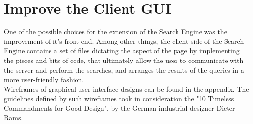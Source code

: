 \section{Improve the Client GUI} %
One of the possible choices for the extension of the Search Engine was the improvement of it's front end. Among other things, the client side of the Search Engine contains a set of files dictating the aspect of the page by implementing the pieces and bits of code, that ultimately allow the user to communicate with the server and perform the searches, and arranges the results of the queries in a more user-friendly fashion.\\
Wireframes of graphical user interface designs can be found in the appendix. The guidelines defined by such wireframes took in consideration the "10 Timeless Commandments for Good Design", by the German industrial designer Dieter Rams. \citep{domingo:designprinciples}
